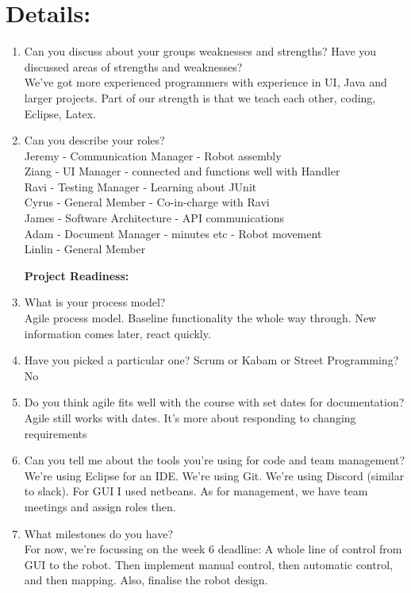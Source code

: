 \documentclass{article}
\begin{document}
\section{Details:}
\begin{enumerate}
\item Can you discuss about your groups weaknesses and strengths? Have you discussed areas of strengths and weaknesses?\\
We've got more experienced programmers with experience in UI, Java and larger projects. Part of our strength is that we teach each other, coding, Eclipse, Latex.
\item Can you describe your roles?\\
Jeremy - Communication Manager - Robot assembly\\
Ziang - UI Manager - connected and functions well with Handler\\
Ravi - Testing Manager - Learning about JUnit\\
Cyrus - General Member - Co-in-charge with Ravi\\
James - Software Architecture - API communications\\
Adam - Document Manager - minutes etc - Robot movement\\
Linlin - General Member\newline

\textbf{Project Readiness:}\\
\item What is your process model?\\
Agile process model. Baseline functionality the whole way through. New information comes later, react quickly.
\item Have you picked a particular one? Scrum or Kabam or Street Programming?\\
No

\item Do you think agile fits well with the course with set dates for documentation?\\
Agile still works with dates. It's more about responding to changing requirements

\item Can you tell me about the tools you're using for code and team management?\\
We're using Eclipse for an IDE. We're using Git. We're using Discord (similar to slack). For GUI I used netbeans. As for management, we have team meetings and assign roles then. 

\item What milestones do you have?\\
For now, we're focussing on the week 6 deadline: A whole line of control from GUI to the robot. Then implement manual control, then automatic control, and then mapping. Also, finalise the robot design.


\end{enumerate}
\end{document}
